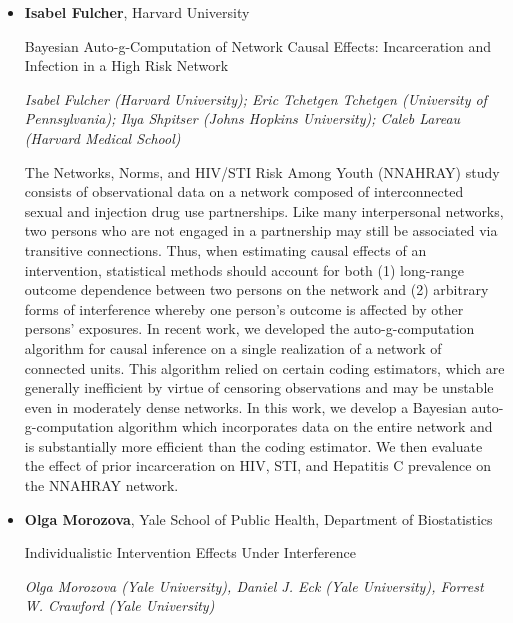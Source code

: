 \begin{itemize}
\item \textbf{Isabel Fulcher}, Harvard University

Bayesian Auto-g-Computation of Network Causal Effects: Incarceration and Infection in a High Risk Network

\emph{\footnotesize Isabel Fulcher (Harvard University); Eric Tchetgen Tchetgen (University of Pennsylvania); Ilya Shpitser (Johns Hopkins University); Caleb Lareau (Harvard Medical School)}

The Networks, Norms, and HIV/STI Risk Among Youth (NNAHRAY) study consists of observational data on a network composed of interconnected sexual and injection drug use partnerships. Like many interpersonal networks, two persons who are not engaged in a partnership may still be associated via transitive connections. Thus, when estimating causal effects of an intervention, statistical methods should account for both (1) long-range outcome dependence between two persons on the network and (2) arbitrary forms of interference whereby one person's outcome is affected by other persons' exposures. In recent work, we developed the auto-g-computation algorithm for causal inference on a single realization of a network of connected units. This algorithm relied on certain coding estimators, which are generally inefficient by virtue of censoring observations and may be unstable even in moderately dense networks. In this work, we develop a Bayesian auto-g-computation algorithm which incorporates data on the entire network and is substantially more efficient than the coding estimator. We then evaluate the effect of prior incarceration on HIV, STI, and Hepatitis C prevalence on the NNAHRAY network.

\item \textbf{Olga Morozova}, Yale School of Public Health, Department of Biostatistics

Individualistic Intervention Effects Under Interference

\emph{\footnotesize Olga Morozova (Yale University), Daniel J. Eck (Yale University), Forrest W. Crawford (Yale University)}


\end{itemize}
